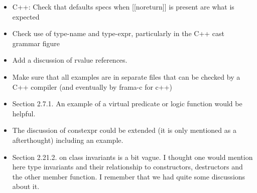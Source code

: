 {\begin{itemize}
	\item C++: Check that defaults specs when [[noreturn]] is present are what is expected
	\item Check use of type-name and type-expr, particularly in the C++ cast grammar figure
	\item Add a discussion of rvalue references.
	\item Make sure that all examples are in separate files that can be checked by a C++ compiler (and eventually by frama-c for c++)
	\item Section 2.7.1. An example of a virtual predicate or logic function would be helpful.
	\item The discussion of constexpr could be extended (it is only mentioned as a afterthought) including an example.
	\item Section 2.21.2. on class invariants is a bit vague.  I thought one would mention here type invariants and their relationship to constructors, destructors and the other member function. I remember that we had quite some discussions about it.
\end{itemize}
}


